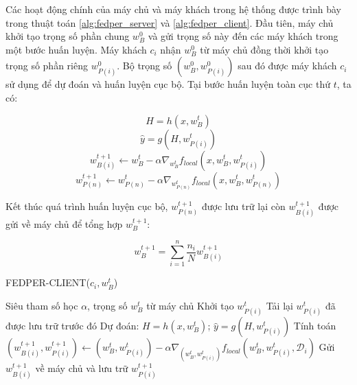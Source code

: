 Các hoạt động chính của máy chủ và máy khách trong hệ thống được trình bày trong thuật toán \ref{alg:fedper_server} và \ref{alg:fedper_client}. Đầu tiên, máy chủ khởi tạo trọng số phần chung $w_B^0$ và gửi trọng số này đến các máy khách trong một bước huấn luyện. Máy khách $c_i$ nhận $w_B^0$ từ máy chủ đồng thời khởi tạo trọng số phần riêng $w_{P(i)}^0$. Bộ trọng số $(w_B^0, w_{P(i)}^0)$ sau đó được máy khách $c_i$ sử dụng để dự đoán và huấn luyện cục bộ. Tại bước huấn luyện toàn cục thứ $t$, ta có:

\begin{equation}
    H = h(x, w_{B}^t)
\end{equation}
\begin{equation}
    \hat{y} = g(H, w_{P(i)}^t)
\end{equation}
\begin{equation}
    w_{B(i)}^{t+1} \leftarrow w_B^t - \alpha\nabla_{w_B^t} f_{local}(x, w_B^t, w_{P(i)}^t)
\end{equation}
\begin{equation}
    w_{P(n)}^{t+1} \leftarrow w_{P(n)}^t - \alpha\nabla_{w_{P(n)}^t} f_{local}(x, w_B^t, w_{P(n)}^t)
\end{equation}

Kết thúc quá trình huấn luyện cục bộ, $w_{P(n)}^{t+1}$ được lưu trữ lại còn $w_{B(i)}^{t+1}$ được gửi về máy chủ để tổng hợp $w_{B}^{t+1}$:

\begin{equation}
    w_B^{t+1} = \sum_{i=1}^n{\frac{n_i}{N}w_{B(i)}^{t+1}}
\end{equation}

\begin{algorithm}
    \caption{FEDPER-CLIENT($c_i, w_B^t$) \cite{arivazhagan2019federated}} \label{alg:fedper_client}
    \begin{algorithmic}[1]
        \Require Siêu tham số học $\alpha$, trọng số $w_B^t$ từ máy chủ
            \State Khởi tạo $w_{P(i)}^t$
        \Else
            \State Tải lại $w_{P(i)}^t$ đã được lưu trữ trước đó
        \EndIf
        \State Dự đoán: $H = h(x, w_{B}^t)$; $\hat{y} = g(H, w_{P(i)}^t)$
        \State Tính toán $(w_{B(i)}^{t+1}, w_{P(i)}^{t+1}) \gets (w_{B}^t, w_{P(i)}^t) - \alpha\nabla_{(w_{B}^t, w_{P(i)}^t)} f_{local}(w_{B}^t, w_{P(i)}^t, \mathcal{D}_i)$
        \State Gửi $w_{B(i)}^{t+1}$ về máy chủ và lưu trữ $w_{P(i)}^{t+1}$
    \end{algorithmic}
\end{algorithm}

